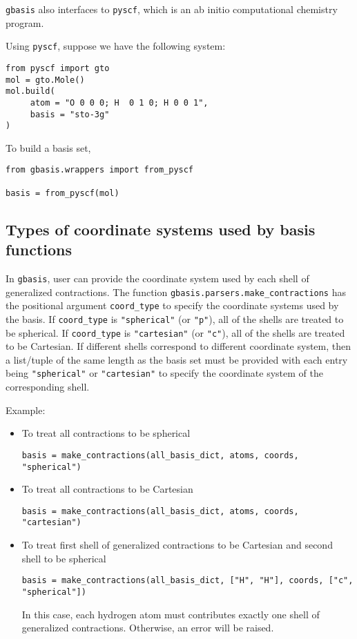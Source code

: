 \documentclass[letterpaper]{article}
\begin{document}
\verb|gbasis| also interfaces to \verb|pyscf|, which is an ab initio computational
chemistry program.

Using \verb|pyscf|, suppose we have the following system:
\begin{lstlisting}
from pyscf import gto
mol = gto.Mole()
mol.build(
     atom = "O 0 0 0; H  0 1 0; H 0 0 1",
     basis = "sto-3g"
)
\end{lstlisting}
To build a basis set,
\begin{lstlisting}
from gbasis.wrappers import from_pyscf

basis = from_pyscf(mol)
\end{lstlisting}

\subsection{Types of coordinate systems used by basis functions}
In \verb|gbasis|, user can provide the coordinate system used by each shell of
generalized contractions.
The function \verb|gbasis.parsers.make_contractions| has the positional argument \verb|coord_type| to
specify the coordinate systems used by the basis.
If \verb|coord_type| is \verb|"spherical"| (or \verb|"p"|), all of the shells are treated to be spherical.
If \verb|coord_type| is \verb|"cartesian"| (or \verb|"c"|), all of the shells are treated to be
Cartesian.
If different shells correspond to different coordinate system, then a list/tuple
of the same length as the basis set must be provided with each entry being
\verb|"spherical"| or \verb|"cartesian"| to specify the coordinate system of the
corresponding shell.

Example:
\begin{itemize}
\item To treat all contractions to be spherical
  \begin{lstlisting}[xleftmargin=-25pt]
basis = make_contractions(all_basis_dict, atoms, coords, "spherical")
\end{lstlisting}
\item To treat all contractions to be Cartesian
  \begin{lstlisting}[xleftmargin=-25pt]
basis = make_contractions(all_basis_dict, atoms, coords, "cartesian")
\end{lstlisting}
\item To treat first shell of generalized contractions to be Cartesian and
  second shell to be spherical
  \begin{lstlisting}[xleftmargin=-25pt]
basis = make_contractions(all_basis_dict, ["H", "H"], coords, ["c", "spherical"])
\end{lstlisting}
In this case, each hydrogen atom must contributes exactly one shell of generalized contractions. Otherwise, an error will be raised.
\end{itemize}
\end{document}

